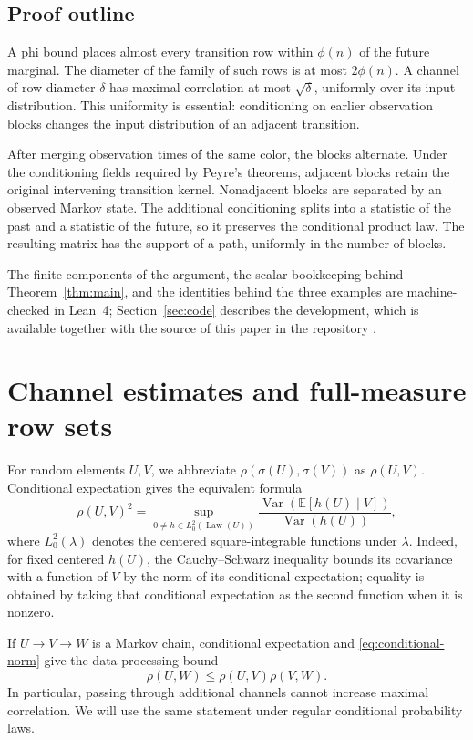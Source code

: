 \documentclass[11pt]{amsart}
\numberwithin{equation}{section}
\theoremstyle{definition}
\newcommand{\EE}{\mathbb E}
\newcommand{\Law}{\operatorname{Law}}
\newcommand{\Var}{\operatorname{Var}}
\begin{document}
\subsection*{Proof outline}
A phi bound places almost every transition row within $\phi(n)$ of the future marginal. The diameter of the family of such rows is at most $2\phi(n)$. A channel of row diameter $\delta$ has maximal correlation at most $\sqrt\delta$, uniformly over its input distribution. This uniformity is essential: conditioning on earlier observation blocks changes the input distribution of an adjacent transition.

After merging observation times of the same color, the blocks alternate. Under the conditioning fields required by Peyre's theorems, adjacent blocks retain the original intervening transition kernel. Nonadjacent blocks are separated by an observed Markov state. The additional conditioning splits into a statistic of the past and a statistic of the future, so it preserves the conditional product law. The resulting matrix has the support of a path, uniformly in the number of blocks.

The finite components of the argument, the scalar bookkeeping behind Theorem~\ref{thm:main}, and the identities behind the three examples are machine-checked in Lean~4; Section~\ref{sec:code} describes the development, which is available together with the source of this paper in the repository \cite{Repo2026}.

\section{Channel estimates and full-measure row sets}\label{sec:channels}

For random elements $U,V$, we abbreviate $\rho(\sigma(U),\sigma(V))$ as $\rho(U,V)$. Conditional expectation gives the equivalent formula
\begin{equation}\label{eq:conditional-norm}
\rho(U,V)^2=
\sup_{0\ne h\in L^2_0(\Law(U))}
\frac{\Var(\EE[h(U)\mid V])}{\Var(h(U))},
\end{equation}
where $L^2_0(\lambda)$ denotes the centered square-integrable functions under $\lambda$. Indeed, for fixed centered $h(U)$, the Cauchy--Schwarz inequality bounds its covariance with a function of $V$ by the norm of its conditional expectation; equality is obtained by taking that conditional expectation as the second function when it is nonzero.

If $U\longrightarrow V\longrightarrow W$ is a Markov chain, conditional expectation and \eqref{eq:conditional-norm} give the data-processing bound
\begin{equation}\label{eq:dp}
\rho(U,W)\le\rho(U,V)\rho(V,W).
\end{equation}
In particular, passing through additional channels cannot increase maximal correlation. We will use the same statement under regular conditional probability laws.
\end{document}
